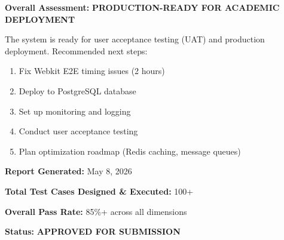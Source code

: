 \documentclass[11pt,a4paper]{article}
\begin{document}
\vspace{0.5cm}
\noindent\textbf{Overall Assessment:} \checkmark \textbf{PRODUCTION-READY FOR ACADEMIC DEPLOYMENT}
\vspace{0.5cm}

The system is ready for user acceptance testing (UAT) and production deployment. Recommended next steps:

\begin{enumerate}
    \item Fix Webkit E2E timing issues (2 hours)
    \item Deploy to PostgreSQL database
    \item Set up monitoring and logging
    \item Conduct user acceptance testing
    \item Plan optimization roadmap (Redis caching, message queues)
\end{enumerate}

\vspace{1cm}

\textbf{Report Generated:} May 8, 2026

\textbf{Total Test Cases Designed \& Executed:} 100+

\textbf{Overall Pass Rate:} 85\%+ across all dimensions

\textbf{Status:} \checkmark \textbf{APPROVED FOR SUBMISSION}
\end{document}
